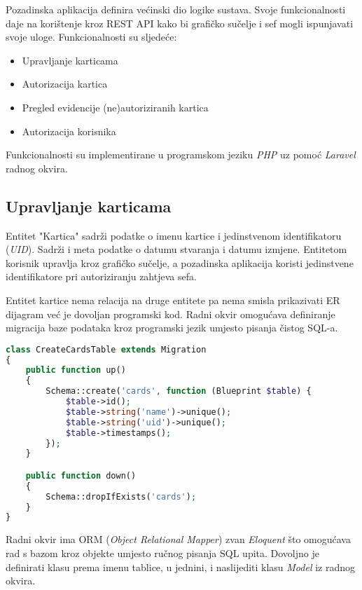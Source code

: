 Pozadinska aplikacija definira većinski dio logike sustava.
Svoje funkcionalnosti daje na korištenje kroz REST API kako bi grafičko sučelje i sef mogli ispunjavati svoje uloge.
Funkcionalnosti su sljedeće:

\begin{itemize}
    \item Upravljanje karticama
    \item Autorizacija kartica
    \item Pregled evidencije (ne)autoriziranih kartica
    \item Autorizacija korisnika
\end{itemize}

Funkcionalnosti su implementirane u programskom jeziku \textit{PHP} uz pomoć \textit{Laravel} radnog okvira.

\subsection{Upravljanje karticama}

Entitet "Kartica" sadrži podatke o imenu kartice i jedinstvenom identifikatoru (\textit{UID}).
Sadrži i meta podatke o datumu stvaranja i datumu izmjene.
Entitetom korisnik upravlja kroz grafičko sučelje, a pozadinska aplikacija koristi jedinstvene identifikatore pri autoriziranju
zahtjeva sefa.

Entitet kartice nema relacija na druge entitete pa nema smisla prikazivati ER dijagram već je dovoljan programski kod.
Radni okvir omogućava definiranje migracija baze podataka kroz programski jezik umjesto pisanja čistog SQL-a.

\begin{lstlisting}[language=PHP]
class CreateCardsTable extends Migration
{
    public function up()
    {
        Schema::create('cards', function (Blueprint $table) {
            $table->id();
            $table->string('name')->unique();
            $table->string('uid')->unique();
            $table->timestamps();
        });
    }

    public function down()
    {
        Schema::dropIfExists('cards');
    }
}
\end{lstlisting}

Radni okvir ima ORM (\textit{Object Relational Mapper}) zvan \textit{Eloquent} što omogućava rad s bazom kroz objekte
umjesto ručnog pisanja SQL upita.
Dovoljno je definirati klasu prema imenu tablice, u jednini, i naslijediti klasu \textit{Model} iz radnog okvira.

